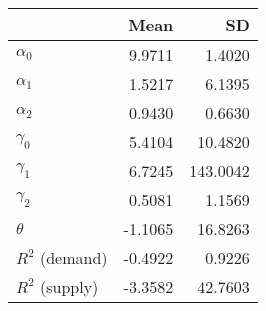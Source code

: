 
\begin{tabular}[t]{lrr}
\toprule
  & Mean & SD\\
\midrule
$\alpha_{0}$ & 9.9711 & 1.4020\\
$\alpha_{1}$ & 1.5217 & 6.1395\\
$\alpha_{2}$ & 0.9430 & 0.6630\\
$\gamma_{0}$ & 5.4104 & 10.4820\\
$\gamma_{1}$ & 6.7245 & 143.0042\\
$\gamma_{2}$ & 0.5081 & 1.1569\\
$\theta$ & -1.1065 & 16.8263\\
$R^{2}$ (demand) & -0.4922 & 0.9226\\
$R^{2}$ (supply) & -3.3582 & 42.7603\\
\bottomrule
\end{tabular}
